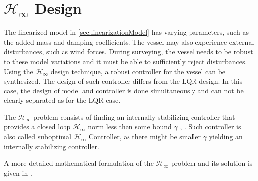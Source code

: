 \section{$\mathcal{H}_\infty$ Design}\label{sec:Hinf}
The linearized model in \autoref{sec:linearizationModel} has varying parameters, such as the added mass and damping coefficients. The vessel may also experience external disturbances, such as wind forces. During surveying, the vessel needs to be robust to these model variations and it must be able to sufficiently reject disturbances. Using the $\mathcal{H}_\infty$ design technique, a robust controller for the vessel can be synthesized. The design of such controller differs from the LQR design. In this case, the design of model and controller is done simultaneously and can not be clearly separated as for the LQR case.

The $\mathcal{H}_\infty$ problem consists of finding an internally stabilizing controller that provides a closed loop $\mathcal{H}_\infty$ norm less than some bound $\gamma$ \cite[p. 835]{JCDoyle}, \cite[pp. 92-93]{AAStoorvogel}. Such controller is also called suboptimal $\mathcal{H}_\infty$ Controller, as there might be smaller $\gamma$ yielding an internally stabilizing controller.%

A more detailed mathematical formulation of the $\mathcal{H}_\infty$ problem and its solution is given in \cite[pp. 91-119]{AAStoorvogel}. 

